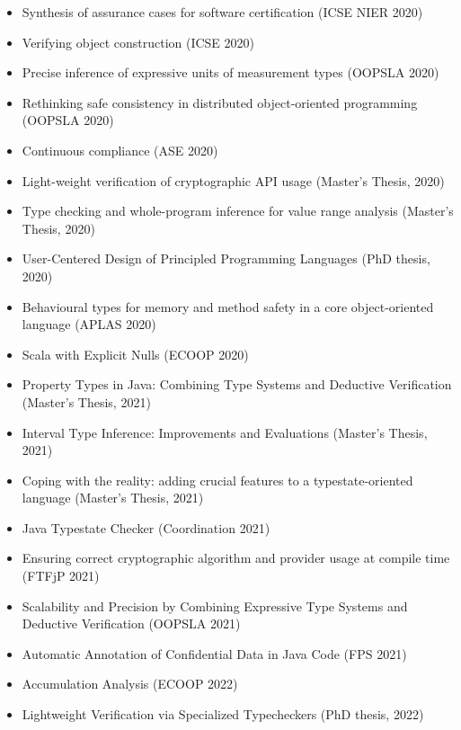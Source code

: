 \begin{itemize}
\item
  Synthesis of assurance cases for software certification (ICSE NIER 2020)~\cite{BagheriKM2020}
\item
  Verifying object construction (ICSE 2020)~\cite{KelloggRSSE2020}
\item
  Precise inference of expressive units of measurement types (OOPSLA 2020)~\cite{XiangLD2020}
\item
  Rethinking safe consistency in distributed object-oriented programming
  (OOPSLA 2020)~\cite{KohlerEWMS2020}
\item
  Continuous compliance (ASE 2020)~\cite{KelloggSTE2020}
\item
  Light-weight verification of cryptographic API usage (Master's Thesis, 2020)~\cite{Xing2020}
\item
  Type checking and whole-program inference for value range analysis (Master's Thesis, 2020)~\cite{Xiang2020}
\item
  User-Centered Design of Principled Programming Languages (PhD thesis, 2020)~\cite{Coblenz2020}
\item
  Behavioural types for memory and method safety in a core object-oriented
  language (APLAS 2020)~\cite{BravettiFGHJKR2020}
\item
  Scala with Explicit Nulls (ECOOP 2020)~\cite{NietoZLCP2020}

\item
  Property Types in {Java}: Combining Type Systems and Deductive Verification
  (Master's Thesis, 2021)~\cite{Lanzinger2021}
\item
  Interval Type Inference: Improvements and Evaluations
  (Master's Thesis, 2021)~\cite{Wang2021}
\item
  Coping with the reality: adding crucial features to a
  typestate-oriented language (Master's Thesis, 2021)~\cite{daLuzMotaM2021}
\item
  Java Typestate Checker (Coordination 2021)~\cite{MotaGR2021}
\item
  Ensuring correct cryptographic algorithm and provider usage at compile time
  (FTFjP 2021)~\cite{XingCD2021}
\item
  Scalability and Precision by Combining Expressive Type Systems and
  Deductive Verification (OOPSLA 2021)~\cite{LanzingerWUD2021}
\item
  Automatic Annotation of Confidential Data in Java Code (FPS 2021)~\cite{BastysBRS2021}

\item
  Accumulation Analysis (ECOOP 2022)~\cite{KelloggSSE2022}
\item
  Lightweight Verification via Specialized Typecheckers (PhD thesis, 2022)~\cite{Kellogg2022}


\end{itemize}



